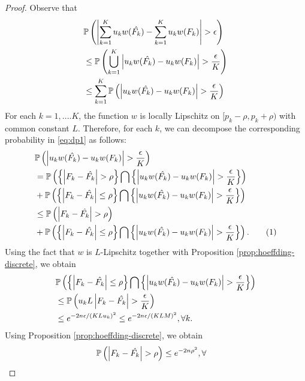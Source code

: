 \begin{proof}
Observe that
\begin{align}
&\mathbb{P}\left( \left| \sum_{k=1}^K u_k w(\hat{F_k}) - \sum_{k=1}^K u_k w(F_k) \right| >\epsilon \right)\nonumber\\
 & \le \mathbb{P}\left( 
\bigcup_{k=1}^K \left| u_k w(\hat{F_k}) -u_k w(F_k) \right| > \frac {\epsilon} {K} \right) \nonumber\\ & \leq
    \sum_{k=1}^K \mathbb{P}\left( \left| u_k w(\hat{F_k}) -u_k w(F_k) \right| > \frac {\epsilon} {K} \right)\label{eq:dp1}
\end{align}
For each $k =1,....K$,
the function $w$ is locally Lipschitz on $[{p_k}- \rho, {p_k}+\rho)$ with common constant $L$.
Therefore, for each $k$, we can decompose the corresponding probability in \eqref{eq:dp1} as follows: 
\begin{align*}
& \Prob{\left| u_k w(\hat{F_k}) -u_k w(F_k) \right| > \frac {\epsilon} {K}} \\ 
& = \Prob{ \left\{ \left| F_k -
\hat{F_k} \right| >\rho \right\} \bigcap \left\{ \left| u_k w(\hat{F_k}) -u_k w(F_k) \right|  > \frac
{\epsilon} {K}\right\}}\\
& + \Prob{ \left\{ \left| F_k - \hat{F_k} \right| \leq\rho \right\} \bigcap \left\{ \left| u_k
    w(\hat{F_k}) -u_k w(F_k) \right|  > \frac {\epsilon} {K}\right\}} 
		\\ & \leq \Prob{ \left| F_k - \hat{F_k}
    \right| >\rho} \\
		&+ \Prob{ \left\{ \left| F_k - \hat{F_k} \right| \leq\rho \right\} \bigcap \left\{ \left| u_k
    w(\hat{F_k}) -u_k w(F_k) \right|  > \frac {\epsilon} {K}\right\}}.\stepcounter{equation}\tag{\theequation}\label{eq:hd0}
\end{align*}
Using the fact that $w$ is $L$-Lipschitz together with Proposition \ref{prop:hoeffding-discrete},
we obtain
\begin{align}
& \mathbb{P}\left(  \left\{ \left| F_k - \hat{F_k} \right| \leq\rho \right\} \bigcap \left\{ \left| u_k
    w(\hat{F_k}) -u_k w(F_k) \right|  > \frac {\epsilon} {K}\right\} \right) \nonumber\\ 
		& \leq \mathbb{P}\left( u_k L \left| F_k - \hat{F_k} \right| > \frac
    {\epsilon} {K} \right)\nonumber\\
		&\leq e^ {-2n\epsilon  /(K L u_k)^2} \leq e^ {-2n\epsilon  /(K L M)^2},
     \forall k.\label{eq:hd1}
\end{align}
Using Proposition \ref{prop:hoeffding-discrete}, we obtain
\begin{align}
\Prob{\left| F_k - \hat{F_k} \right| > \rho} & \leq e^{-2n\rho^2},   \forall

\end{align}
\end{proof}
